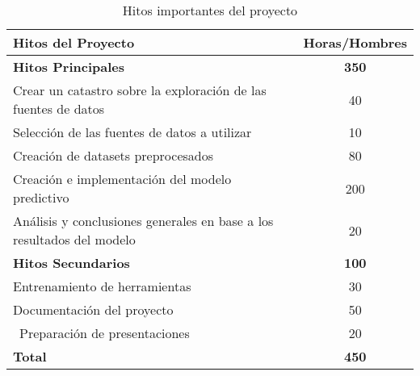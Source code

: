 \begin{table}[H]
\centering
\begin{tabular}{@{}lc@{}}
\toprule
\textbf{Hitos del Proyecto} & \multicolumn{1}{l}{\textbf{Horas/Hombres}\footnotemark[1]} \\ \midrule
\textbf{Hitos Principales} & \textbf{350} \\ \midrule
Crear un catastro sobre la exploración de las fuentes de datos & 40 \\
Selección de las fuentes de datos a utilizar & 10 \\
Creación de datasets preprocesados & 80 \\
Creación e implementación del modelo predictivo & 200 \\
Análisis y conclusiones generales en base a los resultados del modelo & 20 \\ \midrule
\textbf{Hitos Secundarios} & \textbf{100} \\ \midrule
Entrenamiento de herramientas & 30 \\
Documentación del proyecto & 50 \\ \
Preparación de presentaciones & 20 \\ \midrule
\textbf{Total} & \textbf{450} \\ \bottomrule
\end{tabular}
\caption{Hitos importantes del proyecto}
\label{tab:obj2015S2}
\end{table}

